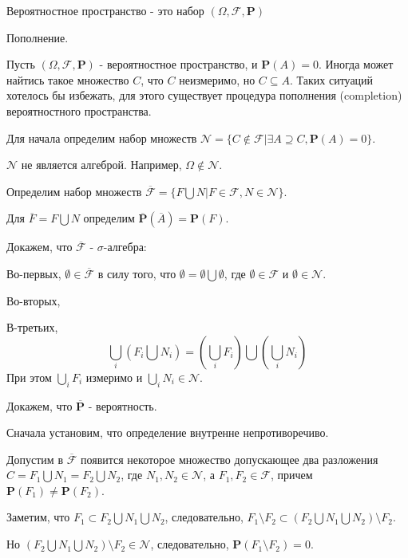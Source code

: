 {\begin{mydef}
Вероятностное пространство - это набор
$(\Omega,\mathcal{F},\mathbf{P})$
\end{mydef}

Пополнение.

Пусть $(\Omega,\mathcal{F},\mathbf{P})$ - вероятностное
пространство, и $\mathbf{P}(A)=0$. Иногда может найтись такое
множество $C$, что $C$ неизмеримо, но $C \subseteq A$. Таких
ситуаций хотелось бы избежать, для этого существует процедура
пополнения (completion) вероятностного пространства.

Для начала определим набор множеств $\mathcal{N}=\{C \notin
\mathcal{F} |\exists A\supseteq C, \mathbf{P}(A)=0\}$.

$\mathcal{N}$ не является алгеброй. Например, $\Omega \notin
\mathcal{N}$.

Определим набор множеств $\mathcal{\overline{F}}=\{F\bigcup N | F
\in \mathcal{F}, N \in \mathcal{N}\}$.

Для $\overline{F}=F\bigcup N$ определим
$\mathbf{\overline{P}}(\overline{A})=\mathbf{P}(F)$.

Докажем, что $\mathcal{\overline{F}}$ - $\sigma$-алгебра:

Во-первых, $\emptyset\in \mathcal{\overline{F}}$  в силу того, что
$\emptyset=\emptyset\bigcup\emptyset$, где
$\emptyset\in\mathcal{F}$ и $\emptyset\in\mathcal{N}$.

Во-вторых,


В-третьих,
$$
\bigcup_{i}\left(F_{i}\bigcup N_{i}\right)=\left(\bigcup_{i}
F_{i}\right)\bigcup\left(\bigcup_{i} N_{i}\right)
$$
При этом $\bigcup_{i} F_{i}$ измеримо и $\bigcup_{i} N_{i} \in
\mathcal{N}$.

Докажем, что $\mathbf{\overline{P}}$ - вероятность.

Сначала установим, что определение внутренне непротиворечиво.

Допустим в $\mathcal{\overline{F}}$ появится некоторое множество
допускающее два разложения $C=F_{1}\bigcup N_{1}=F_{2}\bigcup
N_{2}$, где $N_{1}, N_{2} \in \mathcal{N}$, а $F_{1}, F_{2} \in
\mathcal{F}$, причем $\mathbf{P}(F_{1})\neq \mathbf{P}(F_{2})$.

Заметим, что $F_{1} \subset F_{2}\bigcup N_{1} \bigcup N_{2}$,
следовательно, $F_{1} \setminus F_{2} \subset (F_{2}\bigcup N_{1}
\bigcup N_{2}) \setminus F_{2}$.

Но $(F_{2}\bigcup N_{1} \bigcup N_{2})\setminus F_{2} \in
\mathcal{N}$, следовательно, $\mathbf{P}(F_{1} \setminus
F_{2})=0$.

}
